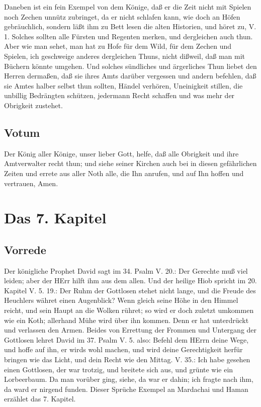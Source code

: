 Daneben ist ein fein Exempel von dem Könige, daß er die Zeit nicht mit Spielen noch Zechen unnütz zubringet, da er nicht schlafen kann, wie doch an Höfen gebräuchlich, sondern läßt ihm zu Bett lesen die alten Historien, und höret zu, V. 1. Solches sollten alle Fürsten und Regenten merken, und dergleichen auch thun. Aber wie man sehet, man hat zu Hofe für dem Wild, für dem Zechen und Spielen, ich geschweige anderes dergleichen Thuns, nicht dißweil, daß man mit Büchern könnte umgehen. Und solches sündliches und ärgerliches Thun liebet den Herren dermaßen, daß sie ihres Amts darüber vergessen und andern befehlen, daß sie Amtes halber selbst thun sollten, Händel verhören, Uneinigkeit stillen, die unbillig Bedrängten schützen, jedermann Recht schaffen und was mehr der Obrigkeit zustehet.

\section{Votum}

Der König aller Könige, unser lieber Gott, helfe, daß alle Obrigkeit und ihre Amtverwalter recht thun; und siehe seiner Kirchen auch bei in diesen gefährlichen Zeiten und errete aus aller Noth alle, die Ihn anrufen, und auf Ihn hoffen und vertrauen, Amen.


\chapter{Das 7. Kapitel}

\section{Vorrede}

Der königliche Prophet David sagt im 34. Psalm V. 20.: Der Gerechte muß viel leiden; aber der HErr hilft ihm aus dem allen. Und der heilige Hiob spricht im 20. Kapitel V. 5. 19.: Der Ruhm der Gottlosen stehet nicht lange, und die Freude des Heuchlers währet einen Augenblick? Wenn gleich seine Höhe in den Himmel reicht, und sein Haupt an die Wolken rühret; so wird er doch zuletzt umkommen wie ein Koth; allerhand Mühe wird über ihn kommen. Denn er hat unterdrückt und verlassen den Armen. Beides von Errettung der Frommen und Untergang der Gottlosen lehret David im 37. Psalm V. 5. also: Befehl dem HErrn deine Wege, und hoffe auf ihn, er wirds wohl machen, und wird deine Gerechtigkeit herfür bringen wie das Licht, und dein Recht wie den Mittag. V. 35.: Ich habe gesehen einen Gottlosen, der war trotzig, und breitete sich aus, und grünte wie ein Lorbeerbaum. Da man vorüber ging, siehe, da war er dahin; ich fragte nach ihm, da ward er nirgend funden. Dieser Sprüche Exempel an Mardachai und Haman erzählet das 7. Kapitel.

